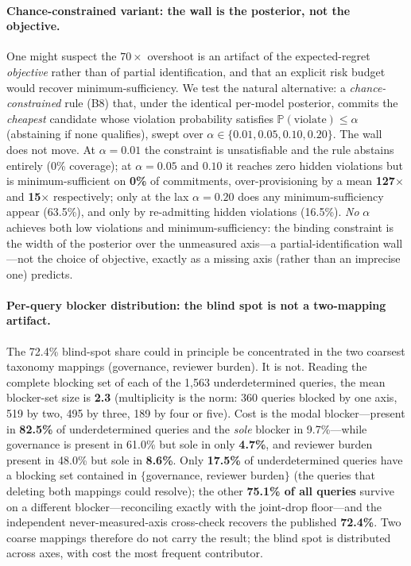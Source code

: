 \documentclass{article} %
\begin{document}
\paragraph{Chance-constrained variant: the wall is the posterior, not the objective.}
One might suspect the $70\times$ overshoot is an artifact of the expected-regret \emph{objective} rather than of partial identification, and that an explicit risk budget would recover minimum-sufficiency. We test the natural alternative: a \emph{chance-constrained} rule (B8) that, under the identical per-model posterior, commits the \emph{cheapest} candidate whose violation probability satisfies $\mathbb{P}(\text{violate})\le\alpha$ (abstaining if none qualifies), swept over $\alpha\in\{0.01,0.05,0.10,0.20\}$. The wall does not move. At $\alpha{=}0.01$ the constraint is unsatisfiable and the rule abstains entirely (0\% coverage); at $\alpha{=}0.05$ and $0.10$ it reaches zero hidden violations but is minimum-sufficient on \textbf{0\%} of commitments, over-provisioning by a mean \textbf{127$\times$} and \textbf{15$\times$} respectively; only at the lax $\alpha{=}0.20$ does any minimum-sufficiency appear (63.5\%), and only by re-admitting hidden violations (16.5\%). \emph{No} $\alpha$ achieves both low violations and minimum-sufficiency: the binding constraint is the width of the posterior over the unmeasured axis---a partial-identification wall---not the choice of objective, exactly as a missing axis (rather than an imprecise one) predicts.

\paragraph{Per-query blocker distribution: the blind spot is not a two-mapping artifact.}
The 72.4\% blind-spot share could in principle be concentrated in the two coarsest taxonomy mappings (governance, reviewer burden). It is not. Reading the complete blocking set of each of the 1{,}563 underdetermined queries, the mean blocker-set size is \textbf{2.3} (multiplicity is the norm: 360 queries blocked by one axis, 519 by two, 495 by three, 189 by four or five). Cost is the modal blocker---present in \textbf{82.5\%} of underdetermined queries and the \emph{sole} blocker in 9.7\%---while governance is present in 61.0\% but sole in only \textbf{4.7\%}, and reviewer burden present in 48.0\% but sole in \textbf{8.6\%}. Only \textbf{17.5\%} of underdetermined queries have a blocking set contained in $\{$governance, reviewer burden$\}$ (the queries that deleting both mappings could resolve); the other \textbf{75.1\% of all queries} survive on a different blocker---reconciling exactly with the joint-drop floor---and the independent never-measured-axis cross-check recovers the published \textbf{72.4\%}. Two coarse mappings therefore do not carry the result; the blind spot is distributed across axes, with cost the most frequent contributor.
\end{document}
